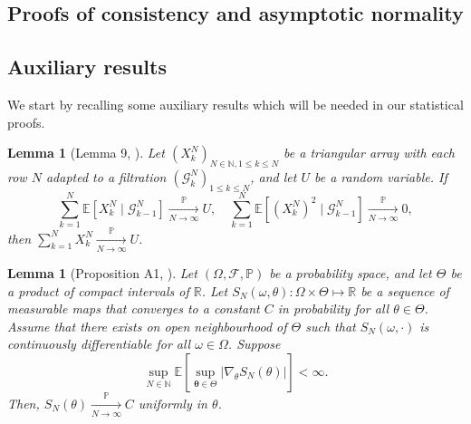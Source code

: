 \documentclass[a4paper,12pt]{article}
\numberwithin{equation}{section}
\theoremstyle{plain}
\newtheorem{lemma}[theorem]{Lemma}
\theoremstyle{definition}
\begin{document}
\begin{appendix}
\section{Proofs of consistency and asymptotic normality}\label{AppendixB}
\subsection{Auxiliary results} We start by recalling some auxiliary results which will be needed in our statistical proofs.

\begin{lemma}[Lemma 9, \cite{jacod_estimation_1993}]\label{lemma:Jacob pointwise convergence}
    Let $\left(X_k^N\right)_{N \in \mathbb{N}, 1 \leq k \leq N}$ be a triangular array with each row $N$ adapted to a filtration $(\mathcal{G}^N_k)_{1\leq k\leq N}$, and let $U$ be a random variable. If
    \begin{equation*}
        \sum_{k=1}^N \mathbb{E}\left[X_k^N \mid \mathcal{G}_{k-1}^N\right] \xrightarrow[N \rightarrow \infty]{\mathbb{P}} U, \quad \sum_{k=1}^N \mathbb{E}\left[\left(X_k^N\right)^2 \mid \mathcal{G}_{k-1}^N\right] \xrightarrow[N \rightarrow \infty]{\mathbb{P}} 0,
    \end{equation*}
    then $\sum_{k=1}^N X_k^N \xrightarrow[N \rightarrow \infty]{\mathbb{P}} U$.
\end{lemma}
\begin{lemma}[Proposition A1, \cite{gloter2006parameter}]\label{lemma:Gloter uniform convergence}
    Let $(\Omega, \mathcal{F}, \mathbb{P})$ be a probability space,  and let $\Theta$ be a product of compact intervals of $\mathbb{R}$. Let $S_N(\omega,\theta):\Omega\times \Theta\mapsto \mathbb{R}$ be a sequence of measurable maps that converges to a constant $C$ in probability for all $\theta\in \Theta$. Assume that there exists on open neighbourhood of $\Theta$ such that $S_N(\omega,\cdot)$ is continuously differentiable for all $\omega\in \Omega$. Suppose
\begin{equation*}
    \sup _{N \in \mathbb{N}} \mathbb{E}\left[\sup _{\boldsymbol{\theta} \in \Theta}\left|\nabla_\theta S_N(\theta)\right|\right]<\infty .
\end{equation*}
Then, $S_N(\theta) \underset{N \rightarrow \infty}{\overset{\mathbb{P}}\longrightarrow} C$ uniformly in $\theta$.
\end{lemma}


\end{appendix}
\end{document}
